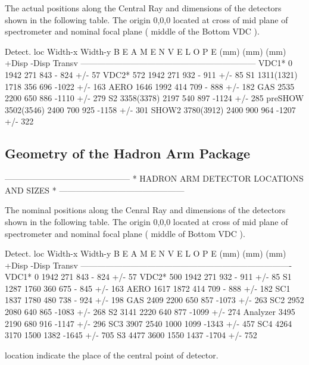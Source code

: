 The actual positions along the Central Ray and dimensions of the detectors shown in 
the following table. The origin 0,0,0 located at cross of mid plane of spectrometer 
and nominal focal plane ( middle of the Bottom VDC ).

Detect.     loc     Width-x  Width-y   B E A M  E N V E L O P E 
            (mm)      (mm)     (mm)    +Disp   -Disp   Transv     
---------------------------------------------------------------  
VDC1*        0        1942     271      843    - 824   +/-  57  
VDC2*       572       1942     271      932    - 911   +/-  85 
S1         1311(1321) 1718     356      696    -1022   +/- 163   
AERO       1646       1992     414      709    - 888   +/- 182   
GAS        2535       2200     650      886    -1110   +/- 279   
S2         3358(3378) 2197     540      897    -1124   +/- 285  
preSHOW    3502(3546) 2400     700      925    -1158   +/- 301   
SHOW2      3780(3912) 2400     900      964    -1207   +/- 322   


\subsection{Geometry of the Hadron Arm Package}
              ---------------------------------------------
              *  HADRON ARM DETECTOR LOCATIONS AND SIZES  *
              ---------------------------------------------

The nominal positions along the Cenral Ray and dimensions of the detectors shown in 
the following table. The origin 0,0,0 located at cross of mid plane of spectrometer 
and nominal focal plane ( middle of Bottom VDC ).

Detect.     loc     Width-x  Width-y   B E A M  E N V E L O P E 
            (mm)      (mm)     (mm)    +Disp   -Disp   Transv    
----------------------------------------------------------------------------
VDC1*        0        1942     271      843    - 824   +/-  57  
VDC2*       500       1942     271      932    - 911   +/-  85 
S1         1287       1760     360      675    - 845   +/- 163   
AERO       1617       1872     414      709    - 888   +/- 182  
SC1        1837       1780     480      738    - 924   +/- 198   
GAS        2409       2200     650      857    -1073   +/- 263   
SC2        2952       2080     640      865    -1083   +/- 268   
S2         3141       2220     640      877    -1099   +/- 274   
Analyzer   3495       2190     680      916    -1147   +/- 296   
SC3        3907       2540    1000     1099    -1343   +/- 457  
SC4        4264       3170    1500     1382    -1645   +/- 705   
S3         4477       3600    1550     1437    -1704   +/- 752  

location indicate the place of the central point of detector.










